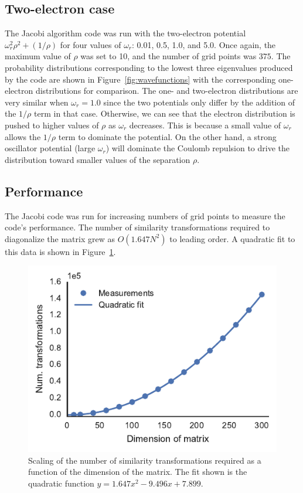\documentclass[aps,prc,reprint,nobalancelastpage]{revtex4-1}
\begin{document}
    \subsection{Two-electron case}
    \label{sub:twoelecresults}
        The Jacobi algorithm code was run with the two-electron potential $\omega_r^2 \rho^2 + (1/\rho)$ for four values of $\omega_r$: 0.01, 0.5, 1.0, and 5.0. Once again, the maximum value of $\rho$ was set to 10, and the number of grid points was $375$. The probability distributions corresponding to the lowest three eigenvalues produced by the code are shown in Figure~\ref{fig:wavefunctions} with the corresponding one-electron distributions for comparison. The one- and two-electron distributions are very similar when $\omega_r = 1.0$ since the two potentials only differ by the addition of the $1/\rho$ term in that case. Otherwise, we can see that the electron distribution is pushed to higher values of $\rho$ as $\omega_r$ decreases. This is because a small value of $\omega_r$ allows the $1/\rho$ term to dominate the potential. On the other hand, a strong oscillator potential (large $\omega_r$) will dominate the Coulomb repulsion to drive the distribution toward smaller values of the separation $\rho$.

    \subsection{Performance}
    \label{sub:perf}
        The Jacobi code was run for increasing numbers of grid points to measure the code's performance. The number of similarity transformations required to diagonalize the matrix grew as $O(1.647 N^2)$ to leading order. A quadratic fit to this data is shown in Figure~\ref{fig:transformScaling}.

        \begin{figure}
            \includegraphics{transformScaling.pdf}
            \caption{Scaling of the number of similarity transformations required as a function of the dimension of the matrix. The fit shown is the quadratic function $y = \num{1.647}x^2 - \num{9.496} x + \num{7.899}.$}
            \label{fig:transformScaling}
        \end{figure}
\end{document}

